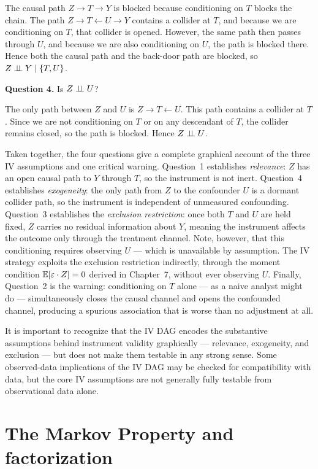 \documentclass[master.tex]{subfiles}
\begin{document}
\noindent The causal path $Z \to T \to Y$ is blocked because conditioning
on $T$ blocks the chain.
The path $Z \to T \leftarrow U \to Y$ contains a collider at $T$, and
because we are conditioning on $T$, that collider is opened.
However, the same path then passes through $U$, and because we are also
conditioning on $U$, the path is blocked there.
Hence both the causal path and the back-door path are blocked, so
$Z \perp\!\!\!\perp Y \mid \{T, U\}$.

\medskip
\noindent\textbf{Question 4.} Is $Z \perp\!\!\!\perp U$?

\noindent The only path between $Z$ and $U$ is $Z \to T \leftarrow U$.
This path contains a collider at $T$.
Since we are not conditioning on $T$ or on any descendant of $T$, the
collider remains closed, so the path is blocked.
Hence $Z \perp\!\!\!\perp U$.

\medskip
Taken together, the four questions give a complete graphical account of the
three IV assumptions and one critical warning.
Question~1 establishes \emph{relevance}: $Z$ has an open causal path to $Y$
through $T$, so the instrument is not inert.
Question~4 establishes \emph{exogeneity}: the only path from $Z$ to the
confounder $U$ is a dormant collider path, so the instrument is
independent of unmeasured confounding.
Question~3 establishes the \emph{exclusion restriction}: once both $T$ and
$U$ are held fixed, $Z$ carries no residual information about $Y$, meaning
the instrument affects the outcome only through the treatment channel.
Note, however, that this conditioning requires observing $U$ --- which is
unavailable by assumption. The IV strategy exploits the exclusion restriction
indirectly, through the moment condition $\mathbb{E}[\varepsilon \cdot Z] = 0$ derived
in Chapter~7, without ever observing $U$.
Finally, Question~2 is the warning: conditioning on $T$ alone --- as a naive
analyst might do --- simultaneously closes the causal channel and opens the
confounded channel, producing a spurious association that is worse than no
adjustment at all.

It is important to recognize that the IV DAG encodes the substantive
assumptions behind instrument validity graphically --- relevance, exogeneity,
and exclusion --- but does not make them testable in any strong sense.
Some observed-data implications of the IV DAG may be checked for
compatibility with data, but the core IV assumptions are not generally
fully testable from observational data alone.

\section{The Markov Property and factorization}
\label{w2:sec:markov}
\end{document}
